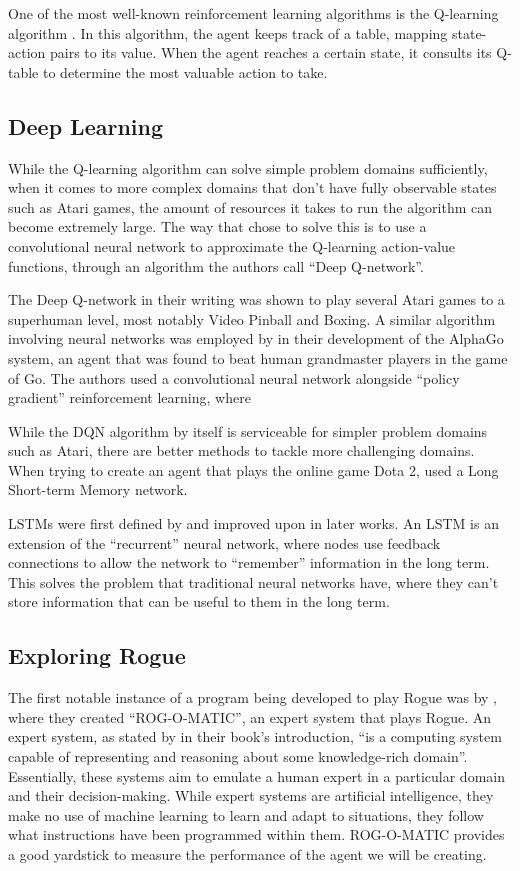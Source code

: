 \documentclass[11pt,a4paper]{article}
\begin{document}
One of the most well-known reinforcement learning algorithms is the Q-learning algorithm \cite[Chapter~6.5]{sutton18}. In this algorithm, the agent keeps track of a table, mapping state-action pairs to its value. When the agent reaches a certain state, it consults its Q-table to determine the most valuable action to take.

\subsection{Deep Learning}
While the Q-learning algorithm can solve simple problem domains sufficiently, when it comes to more complex domains that don't have fully observable states such as Atari games, the amount of resources it takes to run the algorithm can become extremely large. The way that \cite{mnih15} chose to solve this is to use a convolutional neural network to approximate the Q-learning action-value functions, through an algorithm the authors call ``Deep Q-network''.

The Deep Q-network in their writing was shown to play several Atari games to a superhuman level, most notably Video Pinball and Boxing. A similar algorithm involving neural networks was employed by \cite{silver16} in their development of the AlphaGo system, an agent that was found to beat human grandmaster players in the game of Go. The authors used a convolutional neural network alongside ``policy gradient'' reinforcement learning, where

While the DQN algorithm by itself is serviceable for simpler problem domains such as Atari, there are better methods to tackle more challenging domains. When trying to create an agent that plays the online game Dota 2, \cite{berner19} used a Long Short-term Memory network.

LSTMs were first defined by \cite{hochreiter97} and improved upon in later works. An LSTM is an extension of the ``recurrent'' neural network, where nodes use feedback connections to allow the network to ``remember'' information in the long term. This solves the problem that traditional neural networks have, where they can't store information that can be useful to them in the long term.

\subsection{Exploring Rogue}
The first notable instance of a program being developed to play Rogue was by \cite{mauldin83}, where they created ``ROG-O-MATIC'', an expert system that plays Rogue. An expert system, as stated by \cite{jackson86} in their book's introduction, ``is a computing system capable of representing and reasoning about some knowledge-rich domain''. Essentially, these systems aim to emulate a human expert in a particular domain and their decision-making. While expert systems are artificial intelligence, they make no use of machine learning to learn and adapt to situations, they follow what instructions have been programmed within them. ROG-O-MATIC provides a good yardstick to measure the performance of the agent we will be creating.
\end{document}
